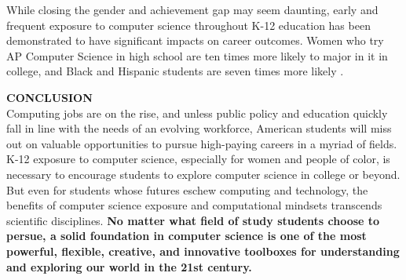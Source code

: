 While closing the gender and achievement gap may seem daunting, early and frequent exposure to computer science throughout K-12 education has been demonstrated to have significant impacts on career outcomes. Women who try AP Computer Science in high school are ten times more likely to major in it in college, and Black and Hispanic students are seven times more likely \cite{apfive}. \par
\textbf{CONCLUSION} \\
Computing jobs are on the rise, and unless public policy and education quickly fall in line with the needs of an evolving workforce, American students will miss out on valuable opportunities to pursue high-paying careers in a myriad of fields. K-12 exposure to computer science, especially for women and people of color, is necessary to encourage students to explore computer science in college or beyond. But even for students whose futures eschew computing and technology, the benefits of computer science exposure and computational mindsets transcends scientific disciplines. \textbf{No matter what field of study students choose to persue, a solid foundation in computer science is one of the most powerful, flexible, creative, and innovative toolboxes for understanding and exploring our world in the 21st century.} \par




